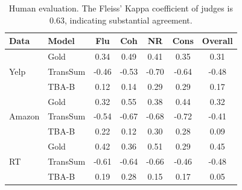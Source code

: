 \begin{table}[th]
	\centering
	\small
\begin{tabular}{|l|l|ccccc|}
	\hline
	\bf Data & \bf Model & \bf Flu & \bf Coh & \bf NR & \bf Cons & \bf Overall \\
	\hline
	\multirow{3}{*}{Yelp}&Gold& 0.34 & 0.49 & 0.41 & 0.35 & 0.31 \\
	&TransSum& -0.46 & -0.53 & -0.70& -0.64& -0.48 \\
	&TBA-B & 0.12 & 0.14 & 0.29 & 0.29 & 0.17 \\
	\hline
	\multirow{3}{*}{Amazon}&Gold& 0.32 & 0.55 & 0.38& 0.44 & 0.32\\
	&TransSum& -0.54 & -0.67 & -0.68 &-0.72 & -0.41 \\
	&TBA-B & 0.22 & 0.12 & 0.30 & 0.28 & 0.09 \\
	\hline
	\multirow{3}{*}{RT}&Gold& 0.42 & 0.36 & 0.51 & 0.29 & 0.45 \\
	&TransSum& -0.61 & -0.64 & -0.66 &-0.46 & -0.48 \\
	&TBA-B & 0.19 & 0.28 & 0.15 & 0.17 &  0.05 \\
	\hline
\end{tabular}
\caption{Human evaluation. The Fleiss' Kappa coefficient of judges is 0.63, indicating substantial agreement.}
\label{tab:human}
\end{table}



